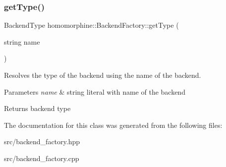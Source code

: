\subsubsection{\texorpdfstring{getType()}{getType()}}
{\footnotesize\ttfamily Backend\+Type homomorphine\+::\+Backend\+Factory\+::get\+Type (\begin{DoxyParamCaption}\item[{string}]{name }\end{DoxyParamCaption})\hspace{0.3cm}{\ttfamily [static]}}

Resolves the type of the backend using the name of the backend.


\begin{DoxyParams}{Parameters}
{\em name} & string literal with name of the backend \\
\hline
\end{DoxyParams}
\begin{DoxyReturn}{Returns}
backend type 
\end{DoxyReturn}


The documentation for this class was generated from the following files\+:\begin{DoxyCompactItemize}
\item 
src/backend\+\_\+factory.\+hpp\item 
src/backend\+\_\+factory.\+cpp\end{DoxyCompactItemize}
